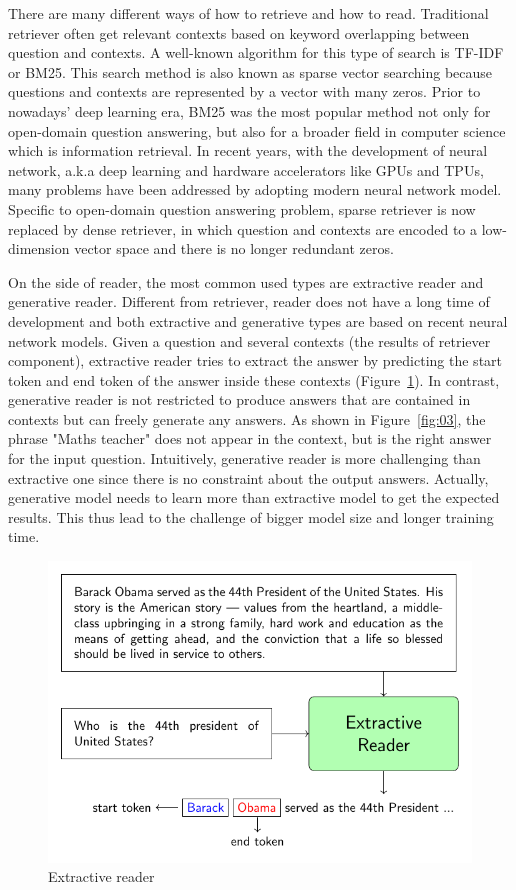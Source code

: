 \documentclass[12pt, sort&compress]{report}
\begin{document}
\par There are many different ways of how to retrieve and how to read. Traditional retriever often get relevant contexts based on keyword overlapping between question and contexts. A well-known algorithm for this type of search is TF-IDF or BM25. This search method is also known as sparse vector searching because questions and contexts are represented by a vector with many zeros. Prior to nowadays' deep learning era, BM25 was the most popular method not only for open-domain question answering, but also for a broader field in computer science which is information retrieval. In recent years, with the development of neural network, a.k.a deep learning and hardware accelerators like GPUs and TPUs, many problems have been addressed by adopting modern neural network model. Specific to open-domain question answering problem, sparse retriever is now replaced by dense retriever, in which question and contexts are encoded to a low-dimension vector space and there is no longer redundant zeros.
\par On the side of reader, the most common used types are extractive reader and generative reader. Different from retriever, reader does not have a long time of development and both extractive and generative types are based on recent neural network models. Given a question and several contexts (the results of retriever component), extractive reader tries to extract the answer by predicting the start token and end token of the answer inside these contexts (Figure~\ref{fig:02}). In contrast, generative reader is not restricted to produce answers that are contained in contexts but can freely generate any answers. As shown in Figure~\ref{fig:03}, the phrase "Maths teacher" does not appear in the context, but is the right answer for the input question. Intuitively, generative reader is more challenging than extractive one since there is no constraint about the output answers. Actually, generative model needs to learn more than extractive model to get the expected results. This thus lead to the challenge of bigger model size and longer training time. 
\begin{figure}[!htbp]
	\centering
	\includegraphics[scale=1.0]{images/PDF/extractive_reader/extractive_reader.pdf}
	\caption{Extractive reader}
	\label{fig:02}
\end{figure}
\end{document}
